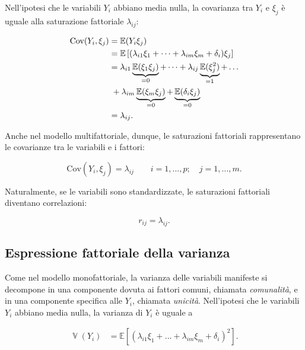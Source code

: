 \documentclass[
  11pt,
]{krantz}
\DeclareMathOperator{\V}{\mathbb{V}} %
\newcommand{\E}{\mathbb{E}} %
\theoremstyle{definition}
\theoremstyle{definition}
\theoremstyle{definition}
\theoremstyle{definition}
\theoremstyle{remark}
\begin{document}
Nell'ipotesi che le variabili \(Y_i\) abbiano media nulla, la covarianza tra \(Y_i\) e \(\xi_j\) è uguale alla saturazione fattoriale \(\lambda_{ij}\):

\begin{equation}
\begin{aligned}
  \mbox{Cov}(Y_i, \xi_j) &= \E(Y_i \xi_j)\notag\\
  &=\E\left[(\lambda_{i1} \xi_1 + \dots + \lambda_{im} \xi_m + \delta_i)\xi_j \right]\notag\\
  &= \lambda_{i1}\underbrace{\E(\xi_1\xi_j)}_{=0} + \dots + 
\lambda_{ij}\underbrace{\E(\xi_j^2)}_{=1} + \dots \notag\\
& \; + \lambda_{im}\underbrace{\E(\xi_m\xi_j)}_{=0} +
  \underbrace{\E(\delta_i \xi_j)}_{=0}\notag\\
  &= \lambda_{ij}.\notag
  \label{eq:cov-multifatt-orto}
\end{aligned}
\end{equation}

Anche nel modello multifattoriale, dunque, le saturazioni fattoriali rappresentano le covarianze tra le variabili e i fattori:

\[
\mbox{Cov}(Y_i, \xi_j) = \lambda_{ij} \qquad i=1, \dots, p; \quad j= 1, \dots, m. 
\]

Naturalmente, se le variabili sono standardizzate, le saturazioni fattoriali diventano correlazioni:

\[
r_{ij} = \lambda_{ij}. 
\]

\hypertarget{espressione-fattoriale-della-varianza-1}{%
\subsection{Espressione fattoriale della varianza}\label{espressione-fattoriale-della-varianza-1}}

Come nel modello monofattoriale, la varianza delle variabili manifeste si decompone in una componente dovuta ai fattori comuni, chiamata \emph{comunalità}, e in una componente specifica alle \(Y_i\), chiamata \emph{unicità}. Nell'ipotesi che le variabili \(Y_i\) abbiano media nulla, la varianza di \(Y_i\) è uguale a

\begin{equation}
\begin{aligned}
  \V (Y_i) 
  &=\E\left[ (\lambda_{i1} \xi_1 + \dots +
    \lambda_{im} \xi_m + \delta_i)^2 \right].
\end{aligned}
\label{eq:eq-var-multifatt}
\end{equation}
\end{document}
